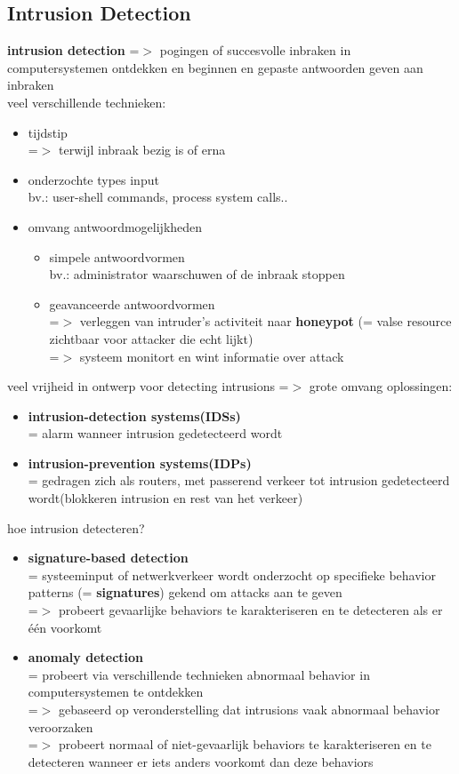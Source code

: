 \documentclass{report}
\begin{document}
\subsection{Intrusion Detection}
\textbf{intrusion detection} =$>$ pogingen of succesvolle inbraken in computersystemen ontdekken en beginnen en gepaste antwoorden geven aan inbraken
\\veel verschillende technieken:
\begin{itemize}
\item tijdstip
\\=$>$ terwijl inbraak bezig is of erna
\item onderzochte types input
\\bv.: user-shell commands, process system calls..
\item omvang antwoordmogelijkheden
\begin{itemize}
\item simpele antwoordvormen
 \\bv.: administrator waarschuwen of de inbraak stoppen
\item geavanceerde antwoordvormen
\\ =$>$ verleggen van intruder's activiteit naar \textbf{honeypot} (= valse resource zichtbaar voor attacker die echt lijkt)
\\=$>$ systeem monitort en wint informatie over attack
\end{itemize}
\end{itemize}
veel vrijheid in ontwerp voor detecting intrusions =$>$ grote omvang oplossingen:
\begin{itemize}
\item \textbf{intrusion-detection systems(IDSs)} 
\\= alarm wanneer intrusion gedetecteerd wordt
\item \textbf{intrusion-prevention systems(IDPs)}
\\= gedragen zich als routers, met passerend verkeer tot intrusion gedetecteerd wordt(blokkeren intrusion en rest van het verkeer)
\end{itemize}
hoe intrusion detecteren?
\begin{itemize}
\item \textbf{signature-based detection} 
\\= systeeminput of netwerkverkeer wordt onderzocht op specifieke behavior patterns (= \textbf{signatures}) gekend om attacks aan te geven
\\=$>$ probeert gevaarlijke behaviors te karakteriseren en te detecteren als er \'e\'en voorkomt
\item \textbf{anomaly detection}
\\= probeert via verschillende technieken abnormaal behavior in computersystemen te ontdekken
\\=$>$ gebaseerd op veronderstelling dat intrusions vaak abnormaal behavior veroorzaken
\\=$>$ probeert normaal of niet-gevaarlijk behaviors te karakteriseren en te detecteren wanneer er iets anders voorkomt dan deze behaviors

\end{itemize}
\end{document}
